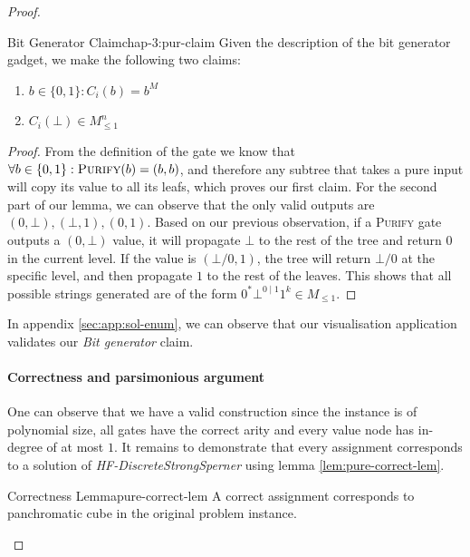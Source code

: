 \begin{proof}
    \begin{claimbox}{Bit Generator Claim}{chap-3:pur-claim}
        Given the description of the bit generator gadget, we make the following two claims:
        \begin{enumerate}
            \item $b \in \{0,1\}: C_i(b) = b^M$
            \item $C_i(\bot) \in M_{\leq 1}^n$
        \end{enumerate}
    \end{claimbox}
    \begin{proof}
        From the definition of the  gate we know that
        $\forall b \in \{0,1\}: \textnormal{\textsc{Purify}}(b) = (b,b)$, and therefore any subtree that takes a pure input will copy its value
        to all its leafs, which proves our first claim. For the second part of our lemma, we can observe that
        the only valid outputs are $(0, \bot), (\bot,1), (0,1)$. Based on our previous observation, if a \textsc{Purify} gate outputs
        a $(0, \bot)$ value, it will propagate $\bot$ to the rest of the tree and return $0$ in the current level.
        If the value is $(\bot/0, 1)$, the tree will return $\bot/0$ at the specific level, and then propagate $1$ to the rest of the leaves.
        This shows that all possible strings generated are of the form $0^*\bot^{0\mid 1} 1^k \in M_{\leq 1}$.
    \end{proof}

    In appendix \ref{sec:app:sol-enum}, we can observe that
    our visualisation application validates our \textit{Bit generator} claim.

    \paragraph*{Correctness and parsimonious argument}
    One can observe that we have a valid construction since the instance is
    of polynomial size, all gates have the correct arity and
    every value node has in-degree of at most $1$.
    It remains to demonstrate that every assignment corresponds to a solution of \textit{HF-DiscreteStrongSperner}
    using lemma \ref{lem:pure-correct-lem}.

    \begin{lemmabox}{Correctness Lemma}{pure-correct-lem}
        A correct assignment corresponds to panchromatic cube in the original problem instance.
    \end{lemmabox}


\end{proof}
